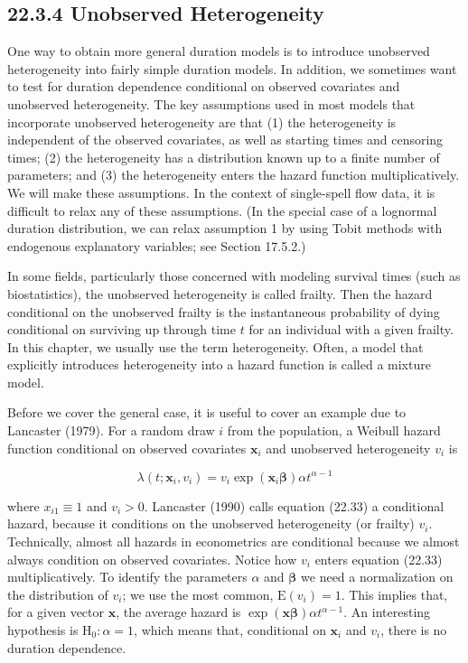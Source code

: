 \documentclass[10pt]{article}
\begin{document}
\subsection*{22.3.4 Unobserved Heterogeneity}
One way to obtain more general duration models is to introduce unobserved heterogeneity into fairly simple duration models. In addition, we sometimes want to test for duration dependence conditional on observed covariates and unobserved heterogeneity. The key assumptions used in most models that incorporate unobserved heterogeneity are that (1) the heterogeneity is independent of the observed covariates, as well as starting times and censoring times; (2) the heterogeneity has a distribution known up to a finite number of parameters; and (3) the heterogeneity enters the hazard function multiplicatively. We will make these assumptions. In the context of single-spell flow data, it is difficult to relax any of these assumptions. (In the special case of a lognormal duration distribution, we can relax assumption 1 by using Tobit methods with endogenous explanatory variables; see Section 17.5.2.)

In some fields, particularly those concerned with modeling survival times (such as biostatistics), the unobserved heterogeneity is called frailty. Then the hazard conditional on the unobserved frailty is the instantaneous probability of dying conditional on surviving up through time $t$ for an individual with a given frailty. In this chapter, we usually use the term heterogeneity. Often, a model that explicitly introduces heterogeneity into a hazard function is called a mixture model.

Before we cover the general case, it is useful to cover an example due to Lancaster (1979). For a random draw $i$ from the population, a Weibull hazard function conditional on observed covariates $\mathbf{x}_{i}$ and unobserved heterogeneity $v_{i}$ is


\begin{equation*}
\lambda\left(t ; \mathbf{x}_{i}, v_{i}\right)=v_{i} \exp \left(\mathbf{x}_{i} \boldsymbol{\beta}\right) \alpha t^{\alpha-1} \tag{22.33}
\end{equation*}


where $x_{i 1} \equiv 1$ and $v_{i}>0$. Lancaster (1990) calls equation (22.33) a conditional hazard, because it conditions on the unobserved heterogeneity (or frailty) $v_{i}$. Technically, almost all hazards in econometrics are conditional because we almost always condition on observed covariates. Notice how $v_{i}$ enters equation (22.33) multiplicatively. To identify the parameters $\alpha$ and $\boldsymbol{\beta}$ we need a normalization on the distribution of $v_{i}$; we use the most common, $\mathrm{E}\left(v_{i}\right)=1$. This implies that, for a given vector $\mathbf{x}$, the average hazard is $\exp (\mathbf{x} \boldsymbol{\beta}) \alpha t^{\alpha-1}$. An interesting hypothesis is $\mathrm{H}_{0}: \alpha=1$, which means that, conditional on $\mathbf{x}_{i}$ and $v_{i}$, there is no duration dependence.
\end{document}
